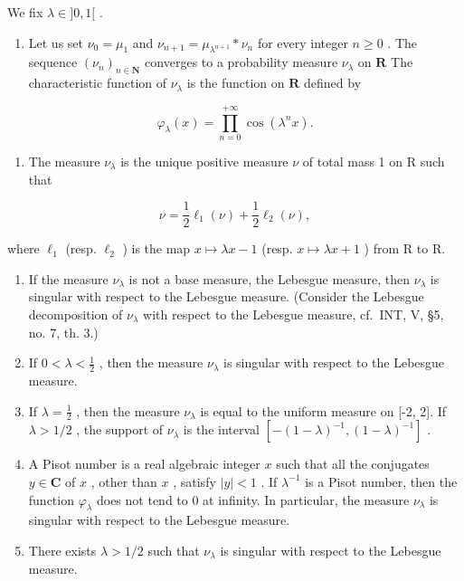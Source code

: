 We fix \(\lambda \in ]0,1[\) .

\begin{enumerate}
\def\labelenumi{\alph{enumi})}
\tightlist
\item
  Let us set \(\nu_0 = \mu_1\) and \(\nu_{n+1} = \mu_{\lambda^{n+1}} * \nu_n\) for every integer \(n \geqslant 0\) . The sequence \((\nu_n)_{n \in \mathbf{N}}\) converges to a probability measure \(\nu_\lambda\) on \(\mathbf{R}\) The characteristic function of \(\nu_\lambda\) is the function on \(\mathbf{R}\) defined by
\end{enumerate}

\[
\varphi_ {\lambda} (x) = \prod_ {n = 0} ^ {+ \infty} \cos (\lambda^ {n} x).
\]

\begin{enumerate}
\def\labelenumi{\alph{enumi})}
\setcounter{enumi}{1}
\tightlist
\item
  The measure \(\nu_{\lambda}\) is the unique positive measure \(\nu\) of total mass 1 on R such that
\end{enumerate}

\[
\nu = \frac {1}{2} \ell_ {1} (\nu) + \frac {1}{2} \ell_ {2} (\nu),
\]

where \(\ell_{1}\) (resp. \(\ell_{2}\) ) is the map \(x \mapsto \lambda x - 1\) (resp. \(x \mapsto \lambda x + 1\) ) from R to R.

\begin{enumerate}
\def\labelenumi{\alph{enumi})}
\setcounter{enumi}{2}
\item
  If the measure \(\nu_{\lambda}\) is not a base measure, the Lebesgue measure, then \(\nu_{\lambda}\) is singular with respect to the Lebesgue measure. (Consider the Lebesgue decomposition of \(\nu_{\lambda}\) with respect to the Lebesgue measure, cf.~INT, V, §5, no. 7, th. 3.)
\item
  If \(0 < \lambda < \frac{1}{2}\) , then the measure \(\nu_{\lambda}\) is singular with respect to the Lebesgue measure.
\item
  If \(\lambda = \frac{1}{2}\) , then the measure \(\nu_{\lambda}\) is equal to the uniform measure on {[}-2, 2{]}. If \(\lambda > 1/2\) , the support of \(\nu_{\lambda}\) is the interval \([-(1-\lambda)^{-1}, (1-\lambda)^{-1}]\) .
\item
  A Pisot number is a real algebraic integer \(x\) such that all the conjugates \(y \in \mathbf{C}\) of \(x\) , other than \(x\) , satisfy \(|y| < 1\) . If \(\lambda^{-1}\) is a Pisot number, then the function \(\varphi_{\lambda}\) does not tend to 0 at infinity. In particular, the measure \(\nu_{\lambda}\) is singular with respect to the Lebesgue measure.
\item
  There exists \(\lambda > 1/2\) such that \(\nu_{\lambda}\) is singular with respect to the Lebesgue measure.
\end{enumerate}
